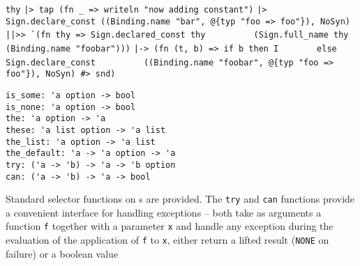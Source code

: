 \begin{isabellebody}
\begin{isamarkuptext}
  \smallskip\begin{mldecls}
\verb|thy|\isasep\isanewline%
\verb||\verb,|,\verb|> tap (fn _ => writeln "now adding constant")|\isasep\isanewline%
\verb||\verb,|,\verb|> Sign.declare_const ((Binding.name "bar", @{typ "foo => foo"}), NoSyn)|\isasep\isanewline%
\verb||\verb,|,\verb||\verb,|,\verb|>> `(fn thy => Sign.declared_const thy|\isasep\isanewline%
\verb|         (Sign.full_name thy (Binding.name "foobar")))|\isasep\isanewline%
\verb||\verb,|,\verb|-> (fn (t, b) => if b then I|\isasep\isanewline%
\verb|       else Sign.declare_const|\isasep\isanewline%
\verb|         ((Binding.name "foobar", @{typ "foo => foo"}), NoSyn) #> snd)|\isasep\isanewline%

  \end{mldecls}%
\end{isamarkuptext}%
\isamarkuptrue%
%
\isamarkuptrue%
%
\isadelimmlref
%
\endisadelimmlref
%
\isatagmlref
%
\begin{isamarkuptext}%
\begin{mldecls}
  \verb|is_some: 'a option -> bool| \\
  \verb|is_none: 'a option -> bool| \\
  \verb|the: 'a option -> 'a| \\
  \verb|these: 'a list option -> 'a list| \\
  \verb|the_list: 'a option -> 'a list| \\
  \verb|the_default: 'a -> 'a option -> 'a| \\
  \verb|try: ('a -> 'b) -> 'a -> 'b option| \\
  \verb|can: ('a -> 'b) -> 'a -> bool| \\
  \end{mldecls}%
\end{isamarkuptext}%
\isamarkuptrue%
%
\endisatagmlref
{\isafoldmlref}%
%
\isadelimmlref
%
\endisadelimmlref
%
\begin{isamarkuptext}%
Standard selector functions on s are provided.  The
  \verb|try| and \verb|can| functions provide a convenient interface for
  handling exceptions -- both take as arguments a function \verb|f|
  together with a parameter \verb|x| and handle any exception during
  the evaluation of the application of \verb|f| to \verb|x|, either
  return a lifted result (\verb|NONE| on failure) or a boolean value

\end{isamarkuptext}
\end{isabellebody}
